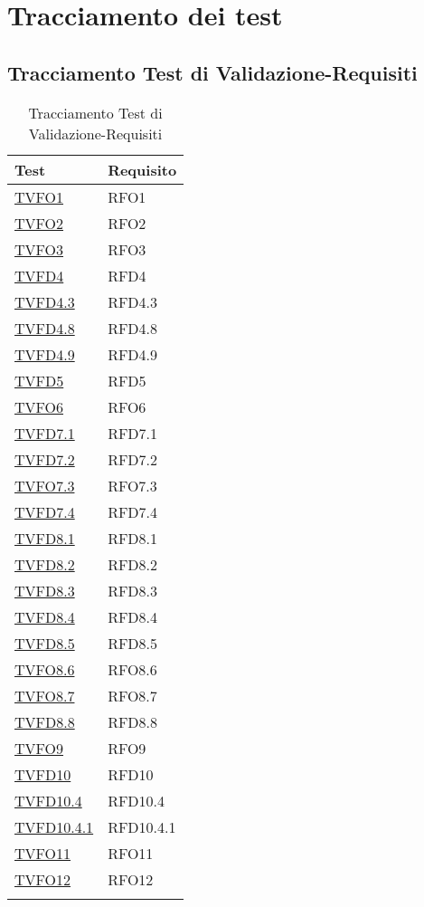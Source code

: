 \section{Tracciamento dei test}
\subsection{Tracciamento Test di Validazione-Requisiti}

\normalsize
\begin{longtable}[ht]{|>{\centering}m{5cm}|m{5cm}<{\centering}|}
\hline 
\textbf{Test} & \textbf{Requisito}\\
\hline
\endhead
\hyperlink{TVFO1}{TVFO1} & RFO1\\ \hline
\hyperlink{TVFO2}{TVFO2} & RFO2\\ \hline
\hyperlink{TVFO3}{TVFO3} & RFO3\\ \hline
\hyperlink{TVFD4}{TVFD4} & RFD4\\ \hline
\hyperlink{TVFD4.3}{TVFD4.3} & RFD4.3\\ \hline
\hyperlink{TVFD4.8}{TVFD4.8} & RFD4.8\\ \hline
\hyperlink{TVFD4.9}{TVFD4.9} & RFD4.9\\ \hline
\hyperlink{TVFD5}{TVFD5} & RFD5\\ \hline
\hyperlink{TVFO6}{TVFO6} & RFO6\\ \hline
\hyperlink{TVFD7.1}{TVFD7.1} & RFD7.1\\ \hline
\hyperlink{TVFD7.2}{TVFD7.2} & RFD7.2\\ \hline
\hyperlink{TVFO7.3}{TVFO7.3} & RFO7.3\\ \hline
\hyperlink{TVFD7.4}{TVFD7.4} & RFD7.4\\ \hline
\hyperlink{TVFD8.1}{TVFD8.1} & RFD8.1\\ \hline
\hyperlink{TVFD8.2}{TVFD8.2} & RFD8.2\\ \hline
\hyperlink{TVFD8.3}{TVFD8.3} & RFD8.3\\ \hline
\hyperlink{TVFD8.4}{TVFD8.4} & RFD8.4\\ \hline
\hyperlink{TVFD8.5}{TVFD8.5} & RFD8.5\\ \hline
\hyperlink{TVFO8.6}{TVFO8.6} & RFO8.6\\ \hline
\hyperlink{TVFO8.7}{TVFO8.7} & RFO8.7\\ \hline
\hyperlink{TVFD8.8}{TVFD8.8} & RFD8.8\\ \hline
\hyperlink{TVFO9}{TVFO9} & RFO9\\ \hline
\hyperlink{TVFD10}{TVFD10} & RFD10\\ \hline
\hyperlink{TVFD10.4}{TVFD10.4} & RFD10.4\\ \hline
\hyperlink{TVFD10.4.1}{TVFD10.4.1} & RFD10.4.1\\ \hline
\hyperlink{TVFO11}{TVFO11} & RFO11\\ \hline
\hyperlink{TVFO12}{TVFO12} & RFO12\\ \hline 
\caption[Tracciamento Test di Validazione-Requisiti]{Tracciamento Test di Validazione-Requisiti}
\label{tabella:tv-requi}

\end{longtable}
\FloatBarrier

